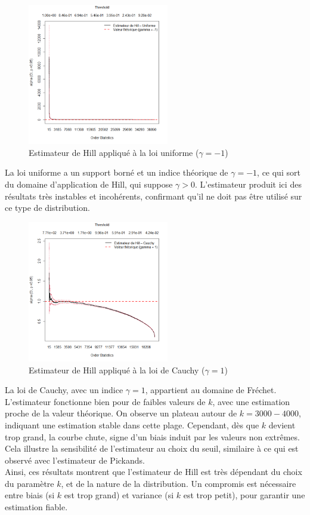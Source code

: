 \documentclass{article}
\theoremstyle{plain}
\theoremstyle{definition}
\theoremstyle{plain}
\begin{document}
\begin{figure}[H]
    \centering
    \includegraphics[width=0.55\textwidth]{./Evolution des estimateurs/hill/estimateur_hill_uniforme.png}
    \caption{Estimateur de Hill appliqué à la loi uniforme ($\gamma = -1$)}
\end{figure}
\noindent La loi uniforme a un support borné et un indice théorique de \(\gamma = -1\), ce qui sort du domaine d’application de Hill, qui suppose \(\gamma > 0\). L’estimateur produit ici des résultats très instables et incohérents, confirmant qu’il ne doit pas être utilisé sur ce type de distribution.

\begin{figure}[H]
    \centering
    \includegraphics[width=0.55\textwidth]{./Evolution des estimateurs/hill/estimateur_hill_cauchy.png}
    \caption{Estimateur de Hill appliqué à la loi de Cauchy ($\gamma = 1$)}
\end{figure}
\noindent La loi de Cauchy, avec un indice $\gamma = 1$, appartient au domaine de Fréchet. L’estimateur fonctionne bien pour de faibles valeurs de $k$, avec une estimation proche de la valeur théorique. On observe un plateau autour de $k = 3000-4000$, indiquant une estimation stable dans cette plage. Cependant, dès que $k$ devient trop grand, la courbe chute, signe d’un biais induit par les valeurs non extrêmes. Cela illustre la sensibilité de l’estimateur au choix du seuil, similaire à ce qui est observé avec l'estimateur de Pickands. \\
\noindent Ainsi, ces résultats montrent que l’estimateur de Hill est très dépendant du choix du paramètre \(k\), et de la nature de la distribution. Un compromis est nécessaire entre biais (si \(k\) est trop grand) et variance (si \(k\) est trop petit), pour garantir une estimation fiable.
\end{document}
